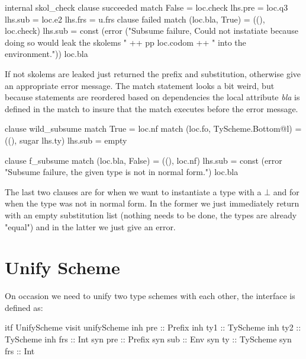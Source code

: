 \begin{code}
                      internal skol_check
                        clause succeeded
                          match False  = loc.check
                          lhs.pre = loc.q3
                          lhs.sub = loc.e2
                          lhs.frs = u.frs
                        clause failed
                          match (loc.bla, True) = ((), loc.check)
                          lhs.sub = const (error ("Subsume failure, Could not instatiate because doing so would leak the skolems " ++ pp loc.codom ++ " into the environment.")) loc.bla
\end{code}
If not skolems are leaked just returned the prefix and substitution, otherwise give an appropriate error message. The match statement looks a bit weird, but because statements are reordered based on dependencies the local attribute \emph{bla} is defined in the match to insure that the match executes before the error message.

\begin{code}
                    clause wild_subsume
                      match True                        = loc.nf
                      match (loc.fo, TyScheme.Bottom@l) = ((), sugar lhs.ty)
                      lhs.sub = empty
                      
                    clause f_subsume
                      match (loc.bla, False) = ((), loc.nf)
                      lhs.sub = const (error "Subsume failure, the given type is not in normal form.") loc.bla
\end{code}
The last two clauses are for when we want to instantiate a type with a $\bot$ and for when the type was not in normal form. In the former we just immediately return with an empty substitution list (nothing needs to be done, the types are already "equal") and in the latter we just give an error.

\section{Unify Scheme} 
On occasion we need to unify two type schemes with each other, the interface is defined as:

\begin{code}
itf UnifyScheme
  visit unifyScheme
    inh pre  :: Prefix
    inh ty1  :: TyScheme
    inh ty2  :: TyScheme
    inh frs  :: Int
    syn pre  :: Prefix
    syn sub  :: Env
    syn ty   :: TyScheme
    syn frs  :: Int 
\end{code}

